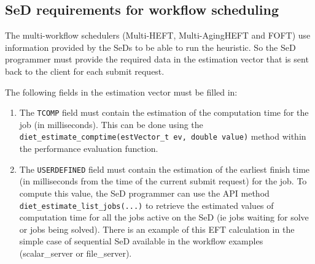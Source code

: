 \subsection{SeD requirements for workflow scheduling}

The multi-workflow schedulers (Multi-HEFT, Multi-AgingHEFT and FOFT) use
information provided by the SeDs to be able to run the heuristic. So the
SeD programmer must provide the required data in the estimation vector that
is sent back to the client for each submit request.

The following fields in the estimation vector must be filled in:
\begin{enumerate}
\item The \texttt{TCOMP} field must contain the estimation of the
computation time for the job (in milliseconds). This can be done using the
\texttt{diet\_estimate\_comptime(estVector\_t ev, double value)} method
within the performance evaluation function.
\item The \texttt{USERDEFINED} field must contain the estimation of the
earliest finish time (in milliseconds from the time of the current submit
request) for the job. To compute this value, the SeD programmer can use
the API method \texttt{diet\_estimate\_list\_jobs(...)} to retrieve the
estimated values of computation time for all the jobs active on the SeD
(ie jobs waiting for solve or jobs being solved). There is an example of
this EFT calculation in the simple case of sequential SeD available in
the workflow examples (scalar\_server or file\_server).
\end{enumerate}

